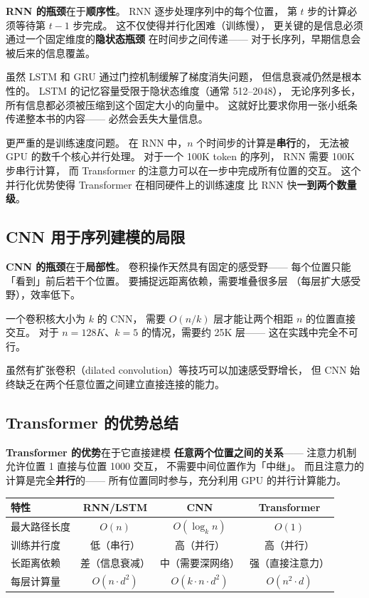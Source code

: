 \textbf{RNN 的瓶颈}在于\textbf{顺序性}。
RNN 逐步处理序列中的每个位置，
第 $t$ 步的计算必须等待第 $t-1$ 步完成。
这不仅使得并行化困难（训练慢），
更关键的是信息必须通过一个固定维度的\textbf{隐状态瓶颈}
在时间步之间传递——
对于长序列，早期信息会被后来的信息覆盖。

虽然 LSTM 和 GRU 通过门控机制缓解了梯度消失问题，
但信息衰减仍然是根本性的。
LSTM 的记忆容量受限于隐状态维度（通常 512--2048），
无论序列多长，所有信息都必须被压缩到这个固定大小的向量中。
这就好比要求你用一张小纸条传递整本书的内容——
必然会丢失大量信息。

更严重的是训练速度问题。
在 RNN 中，$n$ 个时间步的计算是\textbf{串行}的，
无法被 GPU 的数千个核心并行处理。
对于一个 100K token 的序列，
RNN 需要 100K 步串行计算，
而 Transformer 的注意力可以在一步中完成所有位置的交互。
这个并行化优势使得 Transformer 在相同硬件上的训练速度
比 RNN 快\textbf{一到两个数量级}。

\subsection{CNN 用于序列建模的局限}

\textbf{CNN 的瓶颈}在于\textbf{局部性}。
卷积操作天然具有固定的感受野——
每个位置只能「看到」前后若干个位置。
要捕捉远距离依赖，需要堆叠很多层
（每层扩大感受野），效率低下。

一个卷积核大小为 $k$ 的 CNN，
需要 $O(n/k)$ 层才能让两个相距 $n$ 的位置直接交互。
对于 $n = 128K$、$k = 5$ 的情况，需要约 25K 层——
这在实践中完全不可行。

虽然有扩张卷积（dilated convolution）等技巧可以加速感受野增长，
但 CNN 始终缺乏在两个任意位置之间建立直接连接的能力。

\subsection{Transformer 的优势总结}

\textbf{Transformer 的优势}在于它直接建模
\textbf{任意两个位置之间的关系}——
注意力机制允许位置 1 直接与位置 1000 交互，
不需要中间位置作为「中继」。
而且注意力的计算是完全\textbf{并行}的——
所有位置同时参与，充分利用 GPU 的并行计算能力。

\begin{center}
\begin{tabular}{lccc}
\hline
\textbf{特性} & \textbf{RNN/LSTM} & \textbf{CNN} & \textbf{Transformer} \\
\hline
最大路径长度 & $O(n)$ & $O(\log_k n)$ & $O(1)$ \\
训练并行度 & 低（串行） & 高（并行） & 高（并行） \\
长距离依赖 & 差（信息衰减） & 中（需要深网络） & 强（直接注意力） \\
每层计算量 & $O(n \cdot d^2)$ & $O(k \cdot n \cdot d^2)$ & $O(n^2 \cdot d)$ \\
\hline
\end{tabular}
\end{center}

